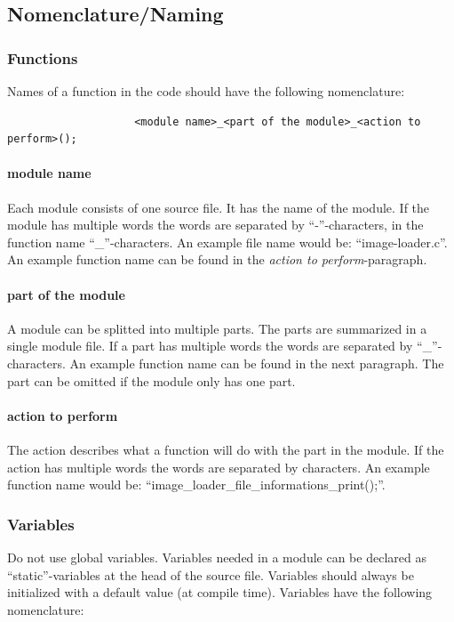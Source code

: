 \documentclass{article}
\begin{document}
		\subsection{Nomenclature/Naming}
			\subsubsection{Functions}
				Names of a function in the code should have the following nomenclature:
				
				\begin{lstlisting}
					<module name>_<part of the module>_<action to perform>();
				\end{lstlisting}
				
				\paragraph{module name} Each module consists of one source file. It has the name of the module. If the module has multiple words the words are separated by ``-''-characters, in the function name ``\_''-characters. An example file name would be: ``image-loader.c''. An example function name can be found in the \emph{action to perform}-paragraph.
				
				\paragraph{part of the module} A module can be splitted into multiple parts. The parts are summarized in a single module file. If a part has multiple words the words are separated by ``\_''-characters. An example function name can be found in the next paragraph. The part can be omitted if the module only has one part.
				
				\paragraph{action to perform} The action describes what a function will do with the part in the module. If the action has multiple words the words are separated by characters. An example function name would be: ``image\_loader\_file\_informations\_print();''.
			
			\subsubsection{Variables}
				Do not use global variables. Variables needed in a module can be declared as ``static''-variables at the head of the source file. Variables should always be initialized with a default value (at compile time). Variables have the following nomenclature:
				
\end{document}
